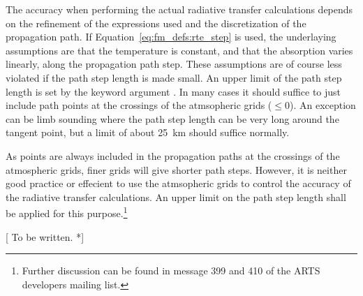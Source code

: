 The accuracy when performing the actual radiative transfer
calculations depends on the refinement of the expressions used and the
discretization of the propagation path. If
Equation~\ref{eq:fm_defs:rte_step} is used, the underlaying
assumptions are that the temperature is constant, and that the
absorption varies linearly, along the propagation path step. These
assumptions are of course less violated if the path step length is
made small. An upper limit of the path step length is set by the
keyword argument . In many cases it should suffice to
just include path points at the crossings of the atmsopheric grids
($\leq0$). An exception can be limb sounding where the
path step length can be very long around the tangent point, but a
limit of about 25~km should suffice normally. 

As points are always included in the propagation paths at the
crossings of the atmospheric grids, finer grids will give shorter path
steps. However, it is neither good practice or effecient to use the
atmsopheric grids to control the accuracy of the radiative transfer
calculations. An upper limit on the path step length shall be applied
for this purpose.\footnote{Further discussion can be found in message
  399 and 410 of the ARTS developers mailing list.}















\label{sec:fm_defs:scattering}

[ To be written. *]




